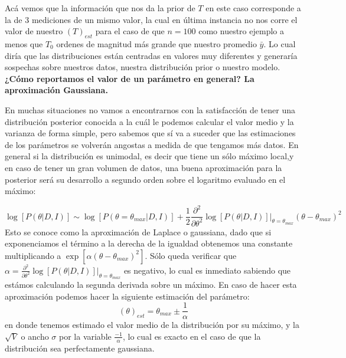 \documentclass[aps,onecolumn,12pt,notitlepage]{revtex4-1}
\begin{document}
Acá vemos que la información que nos da la prior de $T$ en este caso corresponde a la de 3 mediciones de un mismo valor, la cual en última instancia no nos corre el valor de nuestro $(T)_{est}$ para el caso de que $n = 100$ como nuestro ejemplo a menos que $T_0$ ordenes de magnitud más grande que nuestro promedio $\bar{y}$. Lo cual diría que las distribuciones están centradas en valores muy diferentes y generaría sospechas sobre nuestros datos, nuestra distribución prior o nuestro modelo.
\newpage
\textbf{¿Cómo reportamos el valor de un parámetro en general? La aproximación Gaussiana.}

En muchas situaciones no vamos a encontrarnos con la satisfacción de tener una distribución posterior conocida a la cuál le podemos calcular el valor medio y la varianza de forma simple, pero sabemos que sí va a suceder que las estimaciones de los parámetros se volverán angostas a medida de que tengamos más datos. En general si la distribución es unimodal, es decir que tiene un sólo máximo local,y en caso de tener un gran volumen de datos, una buena aproximación para la posterior será su desarrollo a segundo orden sobre el logaritmo evaluado en el máximo:

\begin{equation}
\log\left[P(\theta|D,I)\right] \sim \log\left[P(\theta = \theta_{max}|D,I)\right] + \frac{1}{2}\frac{\partial^2}{\partial \theta^2}\log\left[P(\theta|D,I)\right]|_{\theta= \theta_{max}}(\theta - \theta_{max})^2
\end{equation}
Esto se conoce como la aproximación de Laplace o gaussiana, dado que si exponenciamos el término a la derecha de la igualdad obtenemos una constante multiplicando a $\exp\left[\alpha (\theta-\theta_{max})^2\right]$. Sólo queda verificar que $\alpha = \frac{\partial^2}{\partial \theta^2}\log\left[P(\theta|D,I)\right]|_{\theta= \theta_{max}}$ es negativo, lo cual es inmediato sabiendo que estámos calculando la segunda derivada sobre un máximo. En caso de hacer esta aproximación podemos hacer la siguiente estimación del parámetro:
\begin{equation}
(\theta)_{est} = \theta_{max} \pm \frac{1}{\alpha}
\end{equation}
en donde tenemos estimado el valor medio de la distribución por su máximo, y la $\sqrt{V}$ o ancho $\sigma$ por la variable $\frac{-1}{\alpha}$, lo cual es exacto en el caso de que la distribución sea perfectamente gaussiana.
\end{document}
